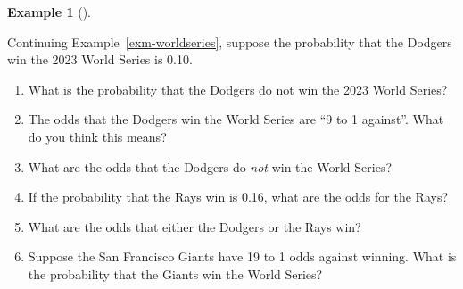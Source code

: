 \documentclass[
  letterpaper,
  DIV=11,
  numbers=noendperiod]{scrreprt}
\providecommand{\tightlist}{%
  \setlength{\itemsep}{0pt}\setlength{\parskip}{0pt}}
\theoremstyle{plain}
\theoremstyle{definition}
\newtheorem{example}{Example}[chapter]
\theoremstyle{definition}
\theoremstyle{definition}
\theoremstyle{remark}
\begin{document}
\begin{tcolorbox}[enhanced jigsaw, opacityback=0, left=2mm, colframe=quarto-callout-note-color-frame, toprule=.15mm, breakable, colback=white, leftrule=.75mm, arc=.35mm, rightrule=.15mm, bottomrule=.15mm]

\begin{example}[]\protect\hypertarget{exm-worldseries-odds}{}\label{exm-worldseries-odds}

Continuing Example~\ref{exm-worldseries}, suppose the probability that
the Dodgers win the 2023 World Series is 0.10.

\begin{enumerate}
\def\labelenumi{\arabic{enumi}.}
\tightlist
\item
  What is the probability that the Dodgers do not win the 2023 World
  Series?
\item
  The odds that the Dodgers win the World Series are ``9 to 1 against''.
  What do you think this means?
\item
  What are the odds that the Dodgers do \emph{not} win the World Series?
\item
  If the probability that the Rays win is 0.16, what are the odds for
  the Rays?
\item
  What are the odds that either the Dodgers or the Rays win?
\item
  Suppose the San Francisco Giants have 19 to 1 odds against winning.
  What is the probability that the Giants win the World Series?
\end{enumerate}

\end{example}

\end{tcolorbox}
\end{document}
